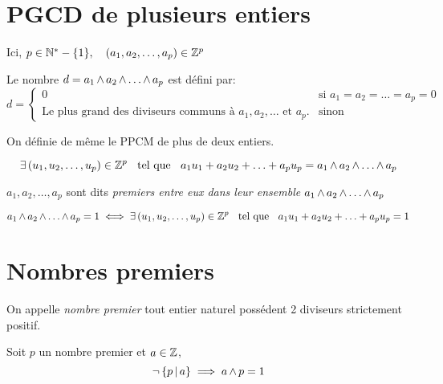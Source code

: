 \section{PGCD de plusieurs entiers}

Ici, $p \in \mathbb{N}^*-\{1\}, \quad (a_1, a_2, \ldots, a_p) \in \mathbb{Z}^p$

\begin{dfn}
Le nombre $d = a_1 \operatorname{\wedge} a_2 \operatorname{\wedge} \ldots \operatorname{\wedge} a_p$
est défini par:
\[   
    d = 
    \begin{cases}
        0   &\text{si } a_1 = a_2 = \ldots = a_p = 0 \\
        \text{Le plus grand des diviseurs communs à } 
        a_1, a_2, \ldots \text{ et } a_p\text{.} &\text{sinon}
    \end{cases}
\]
\end{dfn}

\begin{rem}
On définie de même le PPCM de plus de deux entiers.
\end{rem}

\begin{prp}
\[
    \exists \, (u_1, u_2, \ldots, u_p) \in \mathbb{Z}^p \;\;\text{ tel que }\;\;
    a_1 u_1 + a_2 u_2 + \ldots + a_p u_p
    = a_1 \operatorname{\wedge} a_2 \operatorname{\wedge} \ldots \operatorname{\wedge} a_p
\]
\end{prp}

\begin{dfn}
$a_1, a_2, \ldots, a_p$ sont dits
\emph{premiers entre eux dans leur ensemble} \ssi
$a_1 \operatorname{\wedge} a_2 \operatorname{\wedge} \ldots \operatorname{\wedge} a_p$
\end{dfn}

\begin{prp}
\[
    a_1 \operatorname{\wedge} a_2 \operatorname{\wedge} \ldots \operatorname{\wedge} a_p = 1 \iff
    \exists \, (u_1, u_2, \ldots, u_p) \in \mathbb{Z}^p \;\;\text{ tel que }\;\;
    a_1 u_1 + a_2 u_2 + \ldots + a_p u_p = 1
\]
\end{prp}

\section{Nombres premiers}

\begin{dfn}
On appelle \emph{nombre premier} tout entier naturel possédent
2 diviseurs strictement positif.
\end{dfn}

\begin{prp}
Soit $p$ un nombre premier et $a \in \mathbb{Z}$,
\[
    \neg \left\{p \operatorname{|} a\right\} \implies a \operatorname{\wedge} p = 1
\]
\end{prp}

